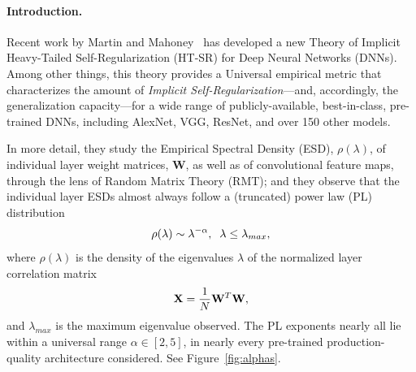 \vspace{-3mm}
\paragraph{Introduction.}

Recent work by Martin and Mahoney~\cite{MM18_TR,MM19_HTSR_ICML} has developed a new Theory of Implicit Heavy-Tailed Self-Regularization (HT-SR) for Deep Neural Networks (DNNs). 
Among other things, this theory provides a Universal empirical metric that characterizes the amount of \emph{Implicit Self-Regularization}---and, accordingly, the generalization capacity---for a wide range of publicly-available, best-in-class, pre-trained DNNs, including AlexNet, VGG, ResNet,  and over 150 other models.

In more detail, they study the Empirical Spectral Density (ESD), $\rho(\lambda)$, of individual layer weight matrices, $\mathbf{W}$, as well as of convolutional feature maps, through the lens of Random Matrix Theory (RMT); and they observe that the individual layer ESDs almost always follow a (truncated) power law (PL) distribution
\vspace{-2mm}
\begin{equation}
\rho(\lambda)\sim\lambda^{-\alpha},\;\;\lambda\le\lambda_{max},
\label{eqn:eigenval_pl}
\vspace{-1mm}
\end{equation}
where $\rho(\lambda)$ is the density of the eigenvalues $\lambda$ of the normalized layer correlation matrix 
\vspace{-2mm}
\begin{equation}
 \mathbf{X} = \frac{1}{N}\mathbf{W}^{T}\mathbf{W},
\vspace{-1mm}
\end{equation}
and $\lambda_{max}$ is the maximum eigenvalue observed.
The PL exponents nearly all lie within a universal range $\alpha\in[2,5]$, in nearly every pre-trained production-quality architecture considered.
See Figure~\ref{fig:alphas}.

